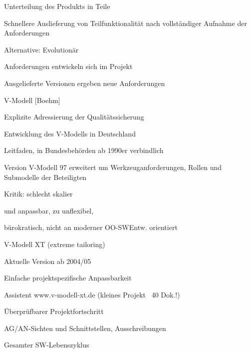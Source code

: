 \documentclass[a4paper]{article}
\begin{document}
\begin{multicols}{3}
\begin{itemize*}
\begin{itemize*}
                  \begin{itemize*}
                    \item Unterteilung des Produkts in Teile
                    \item Schnellere Auslieferung von Teilfunktionalität nach vollständiger Aufnahme der Anforderungen
                  \end{itemize*}
            \item Alternative: Evolutionär
                  \begin{itemize*}
                    \item Anforderungen entwickeln sich im Projekt
                    \item Ausgelieferte Versionen ergeben neue Anforderungen
                  \end{itemize*}
            \item V-Modell [Boehm]
                  \begin{itemize*}
                    \item Explizite Adressierung der Qualitätssicherung
                    \item Entwicklung des V-Modells in Deutschland
                          \begin{itemize*}
                            \item Leitfaden, in Bundesbehörden ab 1990er verbindlich
                            \item Version V-Modell 97 erweitert um Werkzeuganforderungen, Rollen und Submodelle der Beteiligten
                            \item Kritik: schlecht skalier\item und anpassbar, zu unflexibel,
                            \item bürokratisch, nicht an moderner OO-SWEntw. orientiert
                          \end{itemize*}
                    \item V-Modell XT (extreme tailoring)
                          \begin{itemize*}
                            \item Aktuelle Version ab 2004/05
                            \item Einfache projektspezifische Anpassbarkeit
                            \item Assistent www.v-modell-xt.de (kleines Projekt ~40 Dok.!)
                            \item Überprüfbarer Projektfortschritt
                            \item AG/AN-Sichten und Schnittstellen, Ausschreibungen
                            \item Gesamter SW-Lebenszyklus
                          \end{itemize*}
                  \end{itemize*}
          \end{itemize*}
  \end{itemize*}



\end{multicols}
\end{document}
